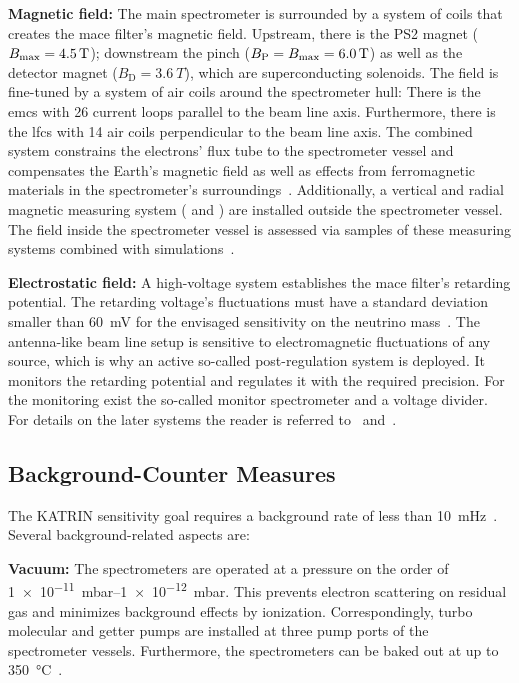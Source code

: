 {\par \textbf{Magnetic field:} The main spectrometer is surrounded by a system of coils that creates the \gls{mace} filter's  magnetic field. Upstream, there is the PS2 magnet ($B_\mathrm{max}=\SI{4.5}{T}$); downstream the pinch ($B_\mathrm{P}=B_\mathrm{max}=\SI{6.0}{T}$) as well as the detector magnet ($B_\mathrm{D}=\SI{3.6}{T}$), which are superconducting solenoids. The field is fine-tuned by a system of air coils around the spectrometer hull: There is the \gls{emcs} with 26 current loops parallel to the beam line axis. Furthermore, there is the \gls{lfcs} with 14 air coils perpendicular to the beam line axis. The combined system constrains the electrons' flux tube to the spectrometer vessel and compensates the Earth's magnetic field as well as effects from ferromagnetic materials in the spectrometer's surroundings~\cite{Erhard2018}. Additionally, a vertical and radial magnetic measuring system ( and ) are installed outside the spectrometer vessel. The field inside the spectrometer vessel is assessed via samples of these measuring systems combined with simulations~\cite{Letnev2018}.}

{\par \textbf{Electrostatic field:} A high-voltage system establishes the \gls{mace} filter's retarding potential. The retarding voltage's fluctuations must have a standard deviation smaller than \SI{60}{mV} for the envisaged sensitivity on the neutrino mass~\cite{Angrik:2005ep}. The antenna-like beam line setup is sensitive to electromagnetic fluctuations of any source, which is why an active so-called post-regulation system is deployed. It monitors the retarding potential and regulates it with the required precision. For the monitoring exist the so-called monitor spectrometer and a voltage divider. For details on the later systems the reader is referred to~\cite{Thuemmler2009} and~\cite{Erhard2014}.}

\subsection{Background-Counter Measures}
\label{sec:katrinExpSetupSpectrometerBGCounterMeasures}
The KATRIN sensitivity goal requires a background rate of less than \SI{10}{mHz}~\cite{Angrik:2005ep}. Several background-related aspects are:

{\par \textbf{Vacuum:} The spectrometers are operated at a pressure on the order of \SIrange{1e-11}{1e-12}{mbar}. This prevents electron scattering on residual gas and minimizes background effects by ionization. Correspondingly, turbo molecular and getter pumps are installed at three pump ports of the spectrometer vessels. Furthermore, the spectrometers can be baked out at up to \SI{350}{\celsius}~\cite{Arenz2016}.}
	
